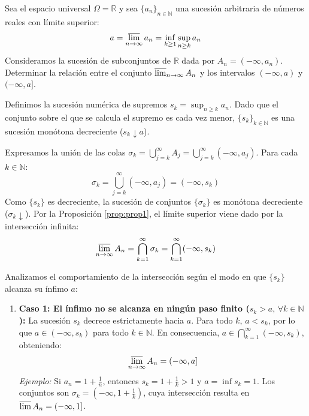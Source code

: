 \newpage
\begin{problema}
Sea el espacio universal $\Omega = \mathbb{R}$ y sea $\{a_n\}_{n \in \mathbb{N}}$ una sucesión arbitraria de números reales con límite superior:
\[
    a = \varlimsup_{n \to \infty} a_n = \inf_{k \ge 1} \sup_{n \ge k} a_n
\]
Consideramos la sucesión de subconjuntos de $\mathbb{R}$ dada por $A_n = (-\infty, a_n)$. Determinar la relación entre el conjunto $\varlimsup_{n \to \infty} A_n$ y los intervalos $(-\infty, a)$ y $(-\infty, a]$.

\tcblower

Definimos la sucesión numérica de supremos $s_k = \sup_{n \ge k} a_n$. Dado que el conjunto sobre el que se calcula el supremo es cada vez menor, $\{s_k\}_{k \in \mathbb{N}}$ es una sucesión monótona decreciente ($s_k \downarrow a$).

Expresamos la unión de las colas $\sigma_k = \bigcup_{j=k}^\infty A_j = \bigcup_{j=k}^\infty (-\infty, a_j)$. Para cada $k \in \mathbb{N}$:
\[
    \sigma_k = \bigcup_{j=k}^\infty (-\infty, a_j) = (-\infty, s_k)
\]
Como $\{s_k\}$ es decreciente, la sucesión de conjuntos $\{\sigma_k\}$ es monótona decreciente ($\sigma_k \downarrow$). Por la Proposición \ref{prop:prop1}, el límite superior viene dado por la intersección infinita:
\[
    \varlimsup_{n \to \infty} A_n = \bigcap_{k=1}^\infty \sigma_k = \bigcap_{k=1}^\infty (-\infty, s_k)
\]

Analizamos el comportamiento de la intersección según el modo en que $\{s_k\}$ alcanza su ínfimo $a$:

\begin{enumerate}[label=\alph*)]
    \item \textbf{Caso 1: El ínfimo no se alcanza en ningún paso finito ($s_k > a, \, \forall k \in \mathbb{N}$):}
    La sucesión $s_k$ decrece estrictamente hacia $a$. Para todo $k$, $a < s_k$, por lo que $a \in (-\infty, s_k)$ para todo $k \in \mathbb{N}$. En consecuencia, $a \in \bigcap_{k=1}^\infty (-\infty, s_k)$, obteniendo:
    \[
        \varlimsup_{n \to \infty} A_n = (-\infty, a]
    \]
    \textit{Ejemplo:} Si $a_n = 1 + \frac{1}{n}$, entonces $s_k = 1 + \frac{1}{k} > 1$ y $a = \inf s_k = 1$. Los conjuntos son $\sigma_k = \left(-\infty, 1 + \frac{1}{k}\right)$, cuya intersección resulta en $\varlimsup A_n = (-\infty, 1]$.


\end{enumerate}
\end{problema}

